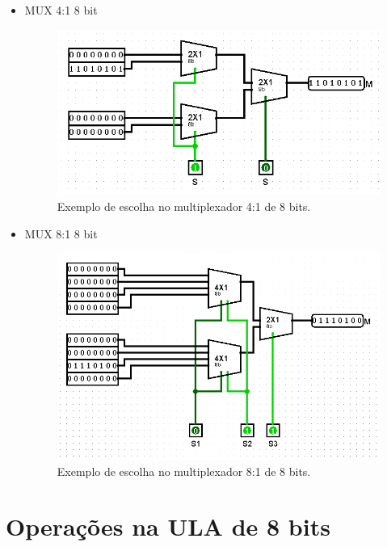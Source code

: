 \documentclass[
	12pt,				%
	openright,			%
	twoside,			%
	a4paper,			%
	english,			%
	french,				%
	spanish,			%
	brazil,				%
	]{abntex2}
\begin{document}
\begin{apendicesenv}
\begin{itemize}
\newpage
\item {MUX 4:1 8 bit}
\begin{figure}[H]
	\begin{center}
	    \includegraphics[scale=0.6]{mux418teste.png}
	\end{center}
\caption{\label{mux418teste}Exemplo de escolha no multiplexador 4:1 de 8 bits.}
\end{figure}

\item {MUX 8:1 8 bit}
\begin{figure}[H]
	\begin{center}
	    \includegraphics[scale=0.6]{mux818teste.png}
	\end{center}
\caption{\label{mux818teste}Exemplo de escolha no multiplexador 8:1 de 8 bits.}
\end{figure}

\end{itemize}

\newpage

\section{Operações na ULA de 8 bits}



\end{apendicesenv}
\end{document}
